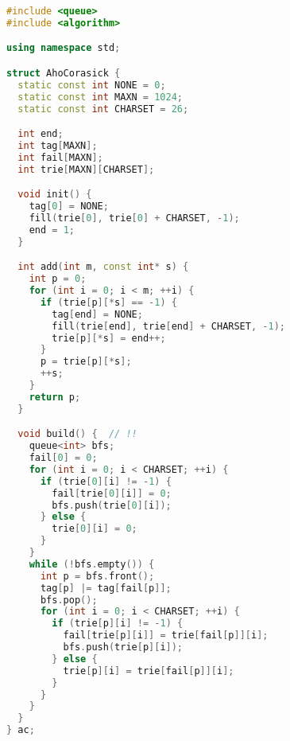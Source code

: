 \begin{lstlisting}[language=C++]
#include <queue>
#include <algorithm>

using namespace std;

struct AhoCorasick {
  static const int NONE = 0;
  static const int MAXN = 1024;
  static const int CHARSET = 26;

  int end;
  int tag[MAXN];
  int fail[MAXN];
  int trie[MAXN][CHARSET];

  void init() {
    tag[0] = NONE;
    fill(trie[0], trie[0] + CHARSET, -1);
    end = 1;
  }

  int add(int m, const int* s) {
    int p = 0;
    for (int i = 0; i < m; ++i) {
      if (trie[p][*s] == -1) {
        tag[end] = NONE;
        fill(trie[end], trie[end] + CHARSET, -1);
        trie[p][*s] = end++;
      }
      p = trie[p][*s];
      ++s;
    }
    return p;
  }

  void build() {  // !!
    queue<int> bfs;
    fail[0] = 0;
    for (int i = 0; i < CHARSET; ++i) {
      if (trie[0][i] != -1) {
        fail[trie[0][i]] = 0;
        bfs.push(trie[0][i]);
      } else {
        trie[0][i] = 0;
      }
    }
    while (!bfs.empty()) {
      int p = bfs.front();
      tag[p] |= tag[fail[p]];
      bfs.pop();
      for (int i = 0; i < CHARSET; ++i) {
        if (trie[p][i] != -1) {
          fail[trie[p][i]] = trie[fail[p]][i];
          bfs.push(trie[p][i]);
        } else {
          trie[p][i] = trie[fail[p]][i];
        }
      }
    }
  }
} ac;


\end{lstlisting}
